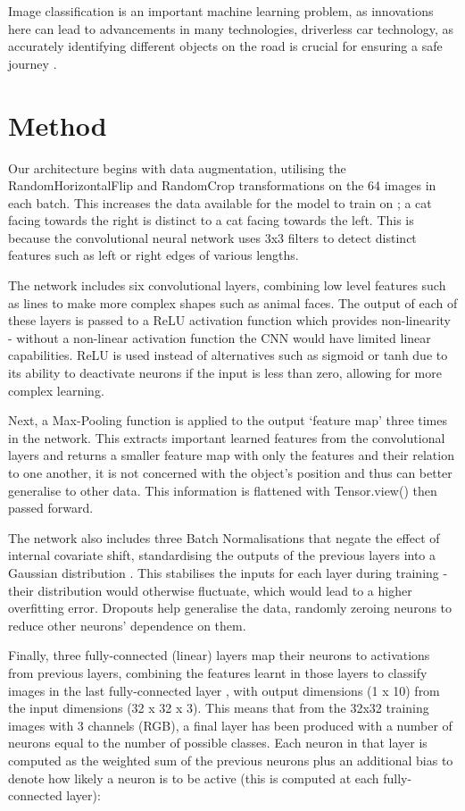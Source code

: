 \documentclass[journal]{IEEEtran}
\begin{document}
Image classification is an important machine learning problem, as innovations here can lead to advancements in many technologies, driverless car technology, as accurately identifying different objects on the road is crucial for ensuring a safe journey \cite{ImageRecognitionApp}.

\section{Method}
Our architecture begins with data augmentation, utilising the RandomHorizontalFlip and RandomCrop transformations on the 64 images in each batch. This increases the data available for the model to train on \cite{dataAug}; a cat facing towards the right is distinct to a cat facing towards the left. This is because the convolutional neural network uses 3x3 filters to detect distinct features such as left or right edges of various lengths.

The network includes six convolutional layers, combining low level features such as lines to make more complex shapes such as animal faces. The output of each of these layers is passed to a ReLU activation function which provides non-linearity - without a non-linear activation function the CNN would have limited linear capabilities. ReLU is used instead of alternatives such as sigmoid or tanh due to its ability to deactivate neurons if the input is less than zero, allowing for more complex learning.

Next, a Max-Pooling function is applied to the output ‘feature map’ three times in the network. This extracts important learned features from the convolutional layers and returns a smaller feature map with only the features and their relation to one another, it is not concerned with the object's position and thus can better generalise to other data. This information is flattened with Tensor.view() then passed forward.

The network also includes three Batch Normalisations that negate the effect of internal covariate shift, standardising the outputs of the previous layers into a Gaussian distribution \cite{ioffe2015batch}. This stabilises the inputs for each layer during training - their distribution would otherwise fluctuate, which would lead to a higher overfitting error. Dropouts help generalise the data, randomly zeroing neurons to reduce other neurons' dependence on them.

Finally, three fully-connected (linear) layers map their neurons to activations from previous layers, combining the features learnt in those layers to classify images in the last fully-connected layer \cite{matlab}, with output dimensions (1 x 10) from the input dimensions (32 x 32 x 3). This means that from the 32x32 training images with 3 channels (RGB), a final layer has been produced with a number of neurons equal to the number of possible classes. Each neuron in that layer is computed as the weighted sum of the previous neurons plus an additional bias to denote how likely a neuron is to be active (this is computed at each fully-connected layer):
\end{document}
